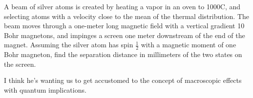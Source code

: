 \begin{question}

  A beam of silver atoms is created by heating a vapor in an oven to
  1000C, and selecting atoms with a velocity close to the mean of the
  thermal distribution. The beam moves through a one-meter long
  magnetic field with a vertical gradient 10 Bohr magnetons, and
  impinges a screen one meter downstream of the end of the
  magnet. Assuming the silver atom has spin $\frac 1 2$ with a
  magnetic moment of one Bohr magneton, find the separation distance
  in millimeters of the two states on the screen.

\end{question}

\begin{purpose}
  I think he's wanting us to get accustomed to the concept of
  macroscopic effects with quantum implications.
\end{purpose}

